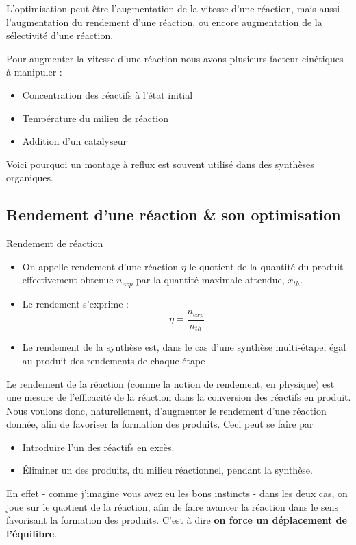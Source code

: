 \documentclass[11pt,a4paper]{article}
\begin{document}
L'optimisation peut être l'augmentation de la vitesse d'une réaction, mais aussi l'augmentation du rendement d'une réaction, ou encore augmentation de la sélectivité d'une réaction. 

Pour augmenter la vitesse d'une réaction nous avons plusieurs facteur cinétiques à manipuler : 
\begin{itemize}
    \item Concentration des réactifs à l'état initial
    \item Température du milieu de réaction
    \item Addition d'un catalyseur
\end{itemize}
Voici pourquoi un montage à reflux est souvent utilisé dans des synthèses organiques. 

\subsection{Rendement d'une réaction \& son optimisation}

\begin{defn}{Rendement de réaction }
\begin{itemize}
    \item On appelle rendement d’une réaction $\eta$ le quotient de la quantité du produit effectivement obtenue $n_{exp}$  par la quantité maximale attendue, $x_{th}$.
    \item Le rendement s'exprime : \[ \eta = \frac{n_{exp}}{n_{th}} \]
    \item Le rendement de la synthèse est, dans le cas d’une synthèse multi-étape, égal au produit des rendements de chaque étape 
\end{itemize}
\end{defn}

Le rendement de la réaction (comme la notion de rendement, en physique) est une mesure de l'efficacité de la réaction  dans la conversion des réactifs en produit. Nous voulons donc, naturellement, d'augmenter le rendement d'une réaction donnée, afin de favoriser la formation des produits. Ceci peut se faire par 
\begin{itemize}
    \item Introduire l'un des réactifs en excès. 
    \item Éliminer un des produits, du milieu réactionnel, pendant la synthèse. 
\end{itemize}
En effet - comme j'imagine vous avez eu les bons instincts - dans les deux cas, on joue sur le quotient de la réaction, afin de faire avancer la réaction dans le sens favorisant la formation des produits. C'est à dire \textbf{on force un déplacement de l'équilibre}. 
\end{document}
